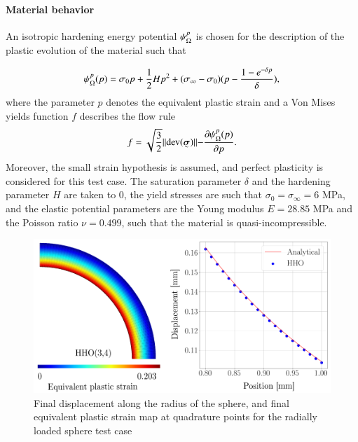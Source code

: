 \paragraph{Material behavior}

An isotropic hardening energy potential $\psi{}_{\Omega{}}^p$ is chosen for the description of the plastic evolution of the material such that

\begin{equation}
    \psi{}_{\Omega{}}^p(p)
    =
    \sigma_0 p + \frac{1}{2} H p^2 + (\sigma_{\infty} - \sigma_0)(p - \frac{1 - e^{-\delta p}}{\delta}),
\end{equation}
%
%
%
where the parameter $p$ denotes the equivalent plastic strain and a Von Mises yields function $f$ describes the flow rule
%
%
%
\begin{equation}
    f = \sqrt{\frac{3}{2}} \rVert \text{dev} (\tensorii{\sigma}) \lVert - \frac{\partial \mecPotential{}_{\bodyLag{}}^p(p)}{\partial p}.
\end{equation}
%
%
%
Moreover, the small strain hypothesis is assumed, and
perfect plasticity is considered for this test case. The saturation parameter $\delta$ and the hardening parameter $H$ are taken to $0$, the yield stresses are such that $\sigma_0 = \sigma_{\infty} = 6$ MPa, and the elastic potential parameters are the Young modulus $E = 28.85$ MPa and the Poisson ratio $\nu = 0.499$, such that the material is quasi-incompressible.

\begin{figure}[H]
    \centering
    \includegraphics[width=12.cm]{../chapter_002_hho_mechanics/drawings/sphere_res.png}
    \caption{Final displacement along the radius of the sphere, and final equivalent plastic strain map at quadrature points for the radially loaded sphere test case}
    \label{fig_sphere_res}
\end{figure}

